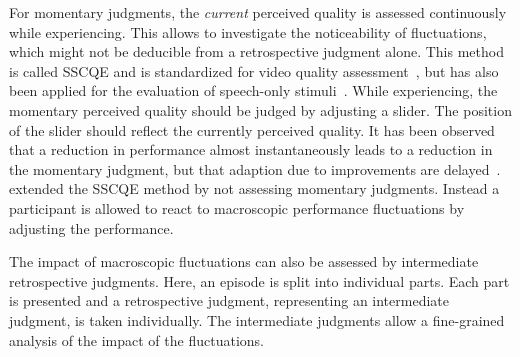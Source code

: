 For momentary judgments, the \emph{current} perceived quality is assessed continuously while experiencing.
This allows to investigate the noticeability of fluctuations, which might not be deducible from a retrospective judgment alone.
This method is called \ac{SSCQE} and is standardized for video quality assessment~\citep[][]{itu-r_recommendation_bt.500-13_methodology_2012}, but has also been applied for the evaluation of speech-only stimuli~\citep[\eg,][]{gros_instantaneous_2001}.
While experiencing, the momentary perceived quality should be judged by adjusting a slider.
The position of the slider should reflect the currently perceived quality.
It has been observed that a reduction in performance almost instantaneously leads to a reduction in the momentary judgment, but that adaption due to improvements are delayed~\citep[\eg,][]{hands_recency_2001, gros_instantaneous_2001, hamberg_time-varying_1999}.
\citet{borowiak_long_2013} extended the \ac{SSCQE} method by not assessing momentary judgments.
Instead a participant is allowed to react to macroscopic performance fluctuations by adjusting the performance.

The impact of macroscopic fluctuations can also be assessed by intermediate retrospective judgments.
Here, an episode is split into individual parts.
Each part is presented and a retrospective judgment, representing an intermediate judgment, is taken individually.
The intermediate judgments allow a fine-grained analysis of the impact of the fluctuations.

